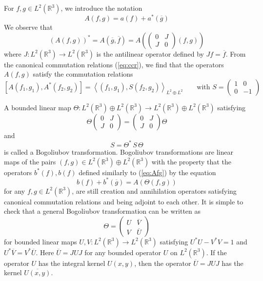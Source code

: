 \documentclass[11pt,a4paper]{article}
\newcommand{\bR}{{\mathbb R}}
\begin{document}
For $f,g \in L^2 (\bR^3)$, we introduce the notation
\begin{equation}\label{eq:Afg} A(f,g) = a(f) + a^* (\overline{g}) \end{equation}
We observe that 
\begin{equation}\label{eq:bog11} 
(A(f,g))^* = A(\overline{g}, \overline{f}) = A \left( \left( \begin{array}{ll} 0 & J \\ J & 0 \end{array} \right) (f,g) \right)\end{equation}
where $J:L^2 (\bR^3) \to L^2 (\bR^3)$ is the antilinear operator defined by $Jf = \overline{f}$. {F}rom the canonical commutation relations (\ref{eq:ccr}), we find that the operators $A(f,g)$ satisfy the commutation relations
\begin{equation}\label{eq:bog22} \left[ A(f_1, g_1) , A^* (f_2, g_2) \right] = \left\langle (f_1, g_1) , S (f_2, g_2) \right\rangle_{L^2 \oplus L^2} \qquad \text{with } S = \left( \begin{array}{ll} 1 & 0 \\ 0 & -1 \end{array} \right) \end{equation}

A bounded linear map $\Theta : L^2 (\bR^3) \oplus L^2 (\bR^3) \to L^2 (\bR^3) \oplus L^2 (\bR^3)$ satisfying
\begin{equation}\label{eq:bog1}
\Theta \left( \begin{array}{ll} 0 & J \\ J & 0 \end{array} \right) = \left( \begin{array}{ll} 0 & J \\ J & 0 \end{array} \right) \Theta \end{equation}
and
\begin{equation}\label{eq:bog2} S = \Theta^* \, S \, \Theta \end{equation}
is called a Bogoliubov transformation. Bogoliubov transformations are linear maps of the pairs $(f,g) \in L^2 (\bR^3) \oplus L^2 (\bR^3)$ with the property that the operators $b^* (f), b(f)$ defined similarly to (\ref{eq:Afg}) by the equation \[ b (f) + b^* (\overline{g}) = A (\Theta (f,g)) \] for any $f,g \in L^2 (\bR^3)$, are still creation and annihilation operators satisfying canonical commutation relations and being adjoint to each other. It is simple to check that a general Bogoliubov transformation can be written as  
\begin{equation}\label{eq:theta-UV} \Theta = \left( \begin{array}{ll} U &  \overline{V}  \\ V & \overline{U} \end{array} \right) \end{equation}
for bounded linear maps $U, V: L^2 (\bR^3) \to L^2 (\bR^3)$ satisfying $U^* U - V^* V = 1$ and $U^* \overline{V} = V^*\overline{U}$. Here $\overline{U} = J U J$ for any bounded operator $U$ on $L^2 (\bR^3)$. If the operator $U$ has the integral kernel $U(x,y)$, then the operator $\overline{U} = J U J$ has the kernel $\overline{U(x,y)}$. 
\end{document}
